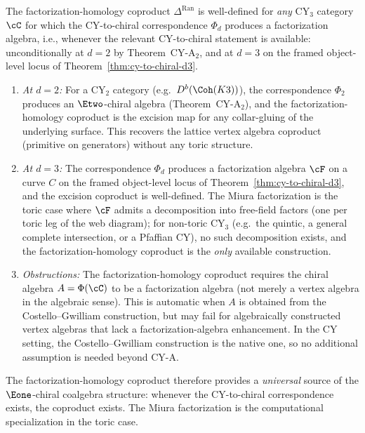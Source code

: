 \begin{remark}
\label{rem:fact-coprod-general-cy3}
The factorization-homology coproduct $\Delta^{\mathrm{Ran}}$ is
well-defined for \emph{any} CY$_3$ category $\cC$ for which the
CY-to-chiral correspondence $\Phi_d$ produces a factorization algebra, i.e.,
whenever the relevant CY-to-chiral statement is available:
unconditionally at $d = 2$ by Theorem~CY-A$_2$, and at
$d = 3$ on the framed object-level locus of Theorem~\ref{thm:cy-to-chiral-d3}.
\begin{enumerate}[label=(\alph*)]
 \item \emph{At $d = 2$:} For a CY$_2$ category
 (e.g.\ $D^b(\Coh(K3))$), the correspondence $\Phi_2$ produces an
 $\Etwo$-chiral algebra (Theorem~CY-A$_2$), and the
 factorization-homology coproduct is the excision map for any
 collar-gluing of the underlying surface. This recovers the
 lattice vertex algebra coproduct (primitive on generators)
 without any toric structure.
 \item \emph{At $d = 3$:} The
 correspondence $\Phi_d$ produces a factorization
 algebra $\cF$ on a curve $C$ on the framed object-level locus of
 Theorem~\ref{thm:cy-to-chiral-d3}, and the excision coproduct is
 well-defined. The Miura factorization is the
 toric case where $\cF$ admits a decomposition into free-field
 factors (one per toric leg of the web diagram); for
 non-toric CY$_3$ (e.g.\ the quintic, a general complete
 intersection, or a Pfaffian CY), no such decomposition exists,
 and the factorization-homology coproduct is the \emph{only}
 available construction.
 \item \emph{Obstructions:} The factorization-homology coproduct
 requires the chiral algebra $A = \Phi(\cC)$ to be a
 factorization algebra (not merely a vertex algebra in the
 algebraic sense). This is automatic when $A$ is obtained from
 the Costello--Gwilliam construction, but may fail for algebraically
 constructed vertex algebras that lack a factorization-algebra
 enhancement. In the CY setting, the Costello--Gwilliam
 construction is the native one, so no additional assumption is
 needed beyond CY-A.
\end{enumerate}
The factorization-homology coproduct therefore provides a
\emph{universal} source of the $\Eone$-chiral coalgebra structure:
whenever the CY-to-chiral correspondence exists, the coproduct exists.
The Miura factorization is the computational specialization in
the toric case.
\end{remark}


